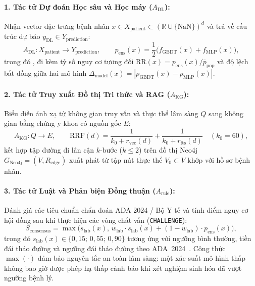\paragraph{1. Tác tử Dự đoán Học sâu và Học máy ($A_{\text{DL}}$):}
Nhận vector đặc trưng bệnh nhân $x \in X_{\text{patient}} \subset (\mathbb{R} \cup \{\text{NaN}\})^d$ và trả về cấu trúc dự báo $y_{\text{DL}} \in Y_{\text{prediction}}$:
\begin{equation}
  A_{\text{DL}} : X_{\text{patient}} \longrightarrow Y_{\text{prediction}}, \qquad
  p_{\text{ens}}(x) = \frac{1}{2}\Big(f_{\text{GBDT}}(x) + f_{\text{MLP}}(x)\Big),
  \label{eq:dl-agent}
\end{equation}
trong đó , đi kèm tỷ số nguy cơ tương đối $\text{RR}(x) = p_{\text{ens}}(x) / \bar{p}_{\text{pop}}$ và độ lệch bất đồng giữa hai mô hình $\Delta_{\text{model}}(x) = |p_{\text{GBDT}}(x) - p_{\text{MLP}}(x)|$.

\paragraph{2. Tác tử Truy xuất Đồ thị Tri thức và RAG ($A_{\text{KG}}$):}
Biểu diễn ánh xạ từ không gian truy vấn và thực thể lâm sàng $Q$ sang không gian bằng chứng y khoa có nguồn gốc $E$:
\begin{equation}
  A_{\text{KG}} : Q \longrightarrow E, \qquad
  \text{RRF}(d) = \frac{1}{k_0 + r_{\text{vec}}(d)} + \frac{1}{k_0 + r_{\text{fts}}(d)} \quad (k_0 = 60),
  \label{eq:kg-agent}
\end{equation}
kết hợp tập đường đi lân cận $k$-bước ($k \le 2$) trên đồ thị Neo4j $G_{\text{Neo4j}} = (V, R_{\text{edge}})$ xuất phát từ tập nút thực thể $V_0 \subset V$ khớp với hồ sơ bệnh nhân.

\paragraph{3. Tác tử Luật và Phản biện Đồng thuận ($A_{\text{rule}}$):}
Đánh giá các tiêu chuẩn chẩn đoán ADA 2024 / Bộ Y tế và tính điểm nguy cơ hội đồng sau khi thực hiện các vòng chất vấn (\texttt{CHALLENGE}):
\begin{equation}
  S_{\text{consensus}} = \max\Big(s_{\text{lab}}(x),\, w_{\text{lab}} \cdot s_{\text{lab}}(x) + (1 - w_{\text{lab}}) \cdot p_{\text{ens}}(x)\Big),
  \label{eq:consensus-score}
\end{equation}
trong đó $s_{\text{lab}}(x) \in \{0{,}15;\, 0{,}55;\, 0{,}90\}$ tương ứng với ngưỡng bình thường, tiền đái tháo đường và ngưỡng đái tháo đường theo ADA~2024~\cite{ada2024}. Công thức $\max(\cdot)$ đảm bảo nguyên tắc an toàn lâm sàng: một xác suất mô hình thấp không bao giờ được phép hạ thấp cảnh báo khi xét nghiệm sinh hóa đã vượt ngưỡng bệnh lý.


